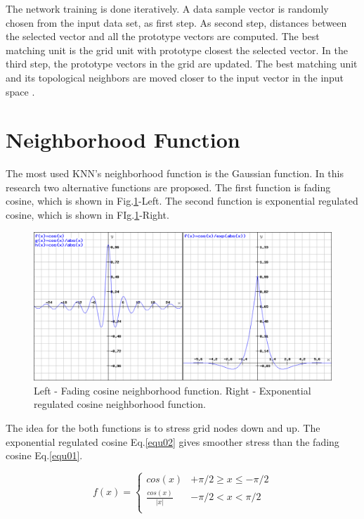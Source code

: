 \documentclass[runningheads]{llncs}
\begin{document}
The network training is done iteratively. A data sample vector is randomly chosen from the input data set, as first step. As second step, distances between the selected vector and all the prototype vectors are computed. The best matching unit is the grid unit with prototype closest the selected vector. In the third step, the prototype vectors in the grid are updated. The best matching unit and its topological neighbors are moved closer to the input vector in the input space \cite{vesanto01}.

\section{Neighborhood Function}

The most used KNN's neighborhood function is the Gaussian function. In this research two alternative functions are proposed. The first function is fading cosine, which is shown in Fig.\ref{fig01}-Left. The second function is exponential regulated cosine, which is shown in FIg.\ref{fig01}-Right.

\begin{figure}
\includegraphics[width=1.0\textwidth]{fig01.png}
\centering
\caption{Left - Fading cosine neighborhood function. Right - Exponential regulated cosine neighborhood function.} \label{fig01}
\end{figure}
\FloatBarrier

The idea for the both functions is to stress grid nodes down and up. The exponential regulated cosine Eq.\ref{equ02} gives smoother stress than the fading cosine Eq.\ref{equ01}. 

\begin{equation} \label{equ01}
f(x) = 
	\begin{cases} 
		cos(x) & +\pi/2 \geq x \leq -\pi/2 \\
		\frac{cos(x)}{|x|} & -\pi/2 < x < \pi/2 \\
	\end{cases}
\end{equation}
\end{document}
